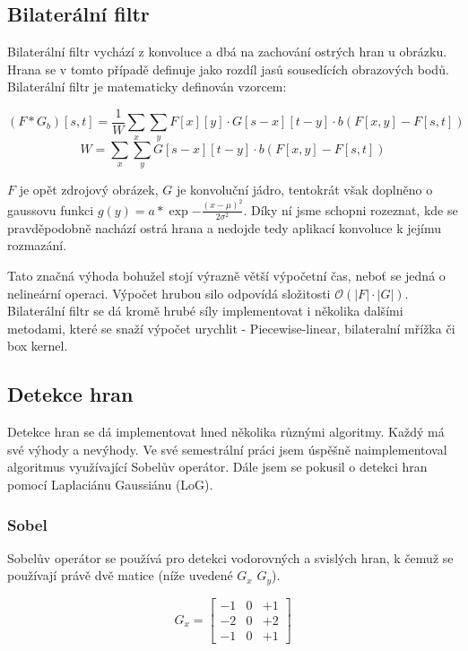 \documentclass[11pt,oneside]{article}
\begin{document}
\subsection{Bilaterální filtr}

Bilaterální filtr vychází z konvoluce a dbá na zachování ostrých hran u obrázku. Hrana se v tomto případě definuje jako rozdíl jasů sousedících obrazových bodů. Bilaterální filtr je matematicky definován vzorcem:

\[
(F * G_b)[s, t] = \frac{1}{W}\sum_{x} \sum_{y} F[x][y] \cdot G[s-x][t-y] \cdot b(F[x,y] - F[s,t])
\]
\[
W = \sum_{x} \sum_{y} G[s-x][t-y] \cdot b(F[x,y] - F[s,t])
\]

$F$ je opět zdrojový obrázek, $G$ je konvoluční jádro, tentokrát však doplněno o gaussovu funkci $g(y) = a*\exp{-\frac{(x-\mu)^2}{2\sigma^2}}$. Díky ní jsme schopni rozeznat, kde se pravděpodobně nachází ostrá hrana a nedojde tedy aplikací konvoluce k jejímu rozmazání.

Tato značná výhoda bohužel stojí výrazně větší výpočetní čas, neboť se jedná o nelineární operaci. Výpočet hrubou silo odpovídá složitosti $\mathcal{O}(|F|\cdot|G|)$. Bilaterální filtr se dá kromě hrubé síly implementovat i několika dalšími metodami, které se snaží výpočet urychlit - Piecewise-linear, bilateralní mřížka či box kernel.

\subsection{Detekce hran}

Detekce hran se dá implementovat hned několika různými algoritmy. Každý má své výhody a nevýhody. Ve své semestrální práci jsem úspěšně naimplementoval algoritmus využívající Sobelův operátor. Dále jsem se pokusil o detekci hran pomocí Laplaciánu Gaussiánu (LoG).

\subsubsection{Sobel}

Sobelův operátor se používá pro detekci vodorovných a svislých hran, k čemuž se používají právě dvě matice (níže uvedené $G_x$ $G_y$). 

\[
G_x = \begin{bmatrix} 
-1 & 0 & +1  \\
-2 & 0 & +2 \\
-1 & 0 & +1 
\end{bmatrix}
\]
\end{document}
